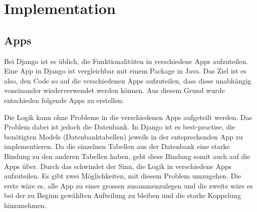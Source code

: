 \section{Implementation}

\subsection{Apps}
Bei Django ist es üblich, die Funktionalitäten in verschiedene Apps aufzuteilen. Eine App in Django ist vergleichbar mit einem Package in Java. Das Ziel ist es also, den Code so auf die verschiedenen Apps aufzuteilen, dass diese unabhängig voneinander wiederverwendet werden können. Aus diesem Grund wurde entschieden folgende Apps zu erstellen:




Die Logik kann ohne Probleme in die verschiedenen Apps aufgeteilt werden. Das Problem dabei ist jedoch die Datenbank. In Django ist es best-practise, die benötigten Models (Datenbanktabellen) jeweils in der entsprechenden App zu implementieren. Da die einzelnen Tabellen aus der Datenbank eine starke Bindung zu den anderen Tabellen haben, geht diese Bindung somit auch auf die Apps über. Durch das schwindet der Sinn, die Logik in verschiedene Apps aufzuteilen. Es gibt zwei Möglichkeiten, mit diesem Problem umzugehen. Die erste wäre es, alle App zu einer grossen zusammenzulegen und die zweite wäre es bei der zu Beginn gewählten Aufteilung zu bleiben und die starke Koppelung hinzunehmen. 
